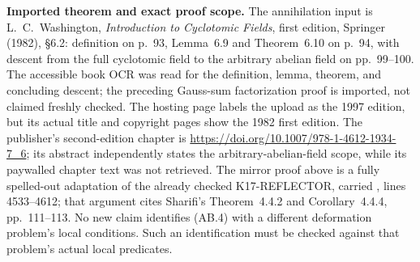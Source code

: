 \documentclass[11pt,a4paper]{article}
\theoremstyle{definition}
\renewcommand{\paragraph}[1]{\par\smallskip\noindent\textbf{#1}\quad\ignorespaces}
\begin{document}
\paragraph{Imported theorem and exact proof scope.}
The annihilation input is L.~C.~Washington,
\emph{Introduction to Cyclotomic Fields}, first edition,
Springer (1982), \S6.2: definition on p.~93,
Lemma~6.9 and Theorem~6.10 on p.~94, with descent from
the full cyclotomic field to the arbitrary abelian field
on pp.~99--100.  The accessible book OCR was read for
the definition, lemma, theorem, and concluding descent;
the preceding Gauss-sum factorization proof is imported,
not claimed freshly checked.  The hosting page labels
the upload as the 1997 edition, but its actual title
and copyright pages show the 1982 first edition.
The publisher's second-edition chapter is
\url{https://doi.org/10.1007/978-1-4612-1934-7_6};
its abstract independently states the arbitrary-abelian-field
scope, while its paywalled chapter text was not retrieved.
The mirror proof above is a fully spelled-out adaptation
of the already checked K17-REFLECTOR, carried
, lines 4533--4612; that argument cites
Sharifi's Theorem~4.4.2 and Corollary~4.4.4, pp.~111--113.
No new claim identifies (AB.4) with a different deformation
problem's local conditions.  Such an identification must
be checked against that problem's actual local predicates.
\end{document}
